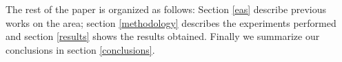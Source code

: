 The rest of the paper is organized as follows:  Section \ref{eas} describe previous works on the area;  section \ref{methodology} describes the experiments performed and section \ref{results} shows the results obtained.  Finally we summarize our conclusions in section \ref{conclusions}.


